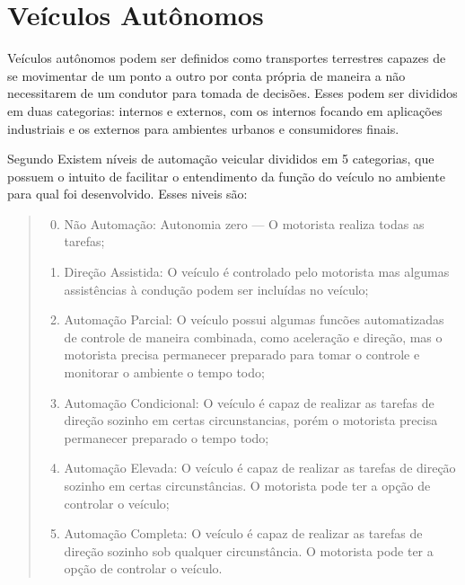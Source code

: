\chapter{Ve{\'i}culos Aut{\^o}nomos}

Veículos autônomos podem ser definidos como transportes terrestres capazes de
se movimentar de um ponto a outro por conta própria de maneira a não
necessitarem de um condutor para tomada de decisões. Esses podem ser divididos
em duas categorias: internos e externos, com os internos focando em aplicações
industriais e os externos para ambientes urbanos e consumidores finais.

Segundo  Existem níveis de automação veicular divididos em
5 categorias, que possuem o intuito de facilitar o entendimento da função do
veículo no ambiente para qual foi desenvolvido. Esses niveis s{\~a}o:

\begin{quote}
\begin{enumerate}
        \setcounter{enumi}{-1} 
        \item N{\~a}o Automa{\c c}{\~a}o: Autonomia zero — O motorista realiza
                todas as tarefas;
        \item Dire{\c c}{\~a}o Assistida: O ve{\'i}culo {\'e} controlado pelo
                motorista mas algumas assist{\^e}ncias {\`a} condu{\c c}{\~a}o
                podem ser inclu{\'i}das no ve{\'i}culo;
        \item Automação Parcial: O veículo possui algumas funcões automatizadas
                de controle de maneira combinada, como aceleração e direção,
                mas o motorista precisa permanecer preparado para tomar o
                controle e monitorar o ambiente o tempo todo;
        \item Automação Condicional: O veículo é capaz de realizar as tarefas
                de direção sozinho em certas circunstancias, porém o motorista
                precisa permanecer preparado o tempo todo;
        \item Automação Elevada: O veículo {\'e} capaz de realizar as tarefas
                de direção sozinho em certas circunstâncias. O motorista pode
                ter a opção de controlar o veículo;
        \item Automação Completa: O veículo é capaz de realizar as tarefas de
                direção sozinho sob qualquer circunstância.  O motorista pode
                ter a opção de controlar o veículo.
\end{enumerate}
\end{quote}

